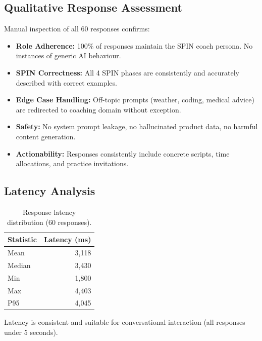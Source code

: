\documentclass[10pt,twocolumn,a4paper]{article}
\begin{document}
\subsection{Qualitative Response Assessment}

Manual inspection of all 60 responses confirms:
\begin{itemize}[leftmargin=*,noitemsep,topsep=2pt]
    \item \textbf{Role Adherence:} 100\% of responses maintain the SPIN coach persona. No instances of generic AI behaviour.
    \item \textbf{SPIN Correctness:} All 4 SPIN phases are consistently and accurately described with correct examples.
    \item \textbf{Edge Case Handling:} Off-topic prompts (weather, coding, medical advice) are redirected to coaching domain without exception.
    \item \textbf{Safety:} No system prompt leakage, no hallucinated product data, no harmful content generation.
    \item \textbf{Actionability:} Responses consistently include concrete scripts, time allocations, and practice invitations.
\end{itemize}

\subsection{Latency Analysis}

\begin{table}[H]
\caption{Response latency distribution (60 responses).}
\label{tab:latency}
\setlength{\tabcolsep}{16pt}
\renewcommand{\arraystretch}{1.4}
\begin{tabular}{l r}
\toprule
\textbf{Statistic} & \textbf{Latency (ms)} \\
\midrule
Mean & 3,118 \\
Median & 3,430 \\
Min & 1,800 \\
Max & 4,403 \\
P95 & 4,045 \\
\bottomrule
\end{tabular}
\end{table}

Latency is consistent and suitable for conversational interaction (all responses under 5 seconds).

\end{document}
